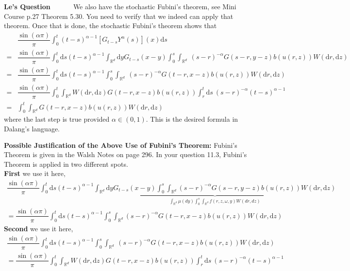 \documentclass[a4paper,11pt]{article}
\theoremstyle{plain}
\theoremstyle{definition}
\newcommand{\ud}{\ensuremath{\mathrm{d}}}
\newcommand{\R}{\mathbb{R}}
\newcounter{LQ}
\newenvironment{LeQuestion}[1][] %
  {\refstepcounter{LQ}
  \begin{mdframed}[backgroundcolor=red!10]\textbf{Le's Question \theLQ \: #1~~}~~~\noindent}%
  {\end{mdframed}}
\numberwithin{NQ}{section}
\numberwithin{LQ}{section}
\numberwithin{ZQ}{section}
\begin{document}
\begin{LeQuestion}
We also have the stochastic Fubini's theorem, see Mini Course p.27 Theorem 5.30. You need to verify that we indeed can apply that theorem. Once that is done, the stochastic Fubini's theorem shows that 
\begin{align*}
    &\dfrac{\sin(\alpha \pi)}{\pi}\int_0^t(t-s)^{\alpha-1}\left[G_{t-s}Y^\alpha(s)\right](x) \ud s \\
    =&\dfrac{\sin(\alpha \pi)}{\pi}\int_0^t \ud s (t-s)^{\alpha-1}\int_{\R^d} \ud y G_{t-s}(x-y)
    \int_0^s \int_{\R^d} \: (s-r)^{-\alpha}G(s-r,y-z)b(u(r,z))W(\ud r,\ud z)\\
    =& \dfrac{\sin(\alpha \pi)}{\pi}\int_0^t \ud s (t-s)^{\alpha-1}
    \int_0^s \int_{\R^d} \: (s-r)^{-\alpha}G(t-r,x-z)b(u(r,z))W(\ud r,\ud z)\\
    =& \dfrac{\sin(\alpha \pi)}{\pi}
    \int_0^t  \int_{\R^d} W(\ud r,\ud z)G(t-r,x-z)b(u(r,z)) 
    \int_r^t \ud s\: (s-r)^{-\alpha} (t-s)^{\alpha-1} \\
    =& \int_0^t  \int_{\R^d} G(t-r,x-z)b(u(r,z)) W(\ud r,\ud z)
\end{align*}
where the last step is true provided $\alpha\in (0,1)$. This is the desired formula in Dalang's language. 
\end{LeQuestion}
\textbf{Possible Justification of the Above Use of Fubini's Theorem:} Fubini's Theorem is given in the Walsh  Notes on page 296. In your question 11.3, Fubini's Theorem is applied in two different spots. \\ 

\noindent \textbf{First} we use it here,
\begin{align*}
     \dfrac{\sin(\alpha \pi)}{\pi}\int_0^t \ud s (t-s)^{\alpha-1}\underbrace{\int_{\R^d} \ud y G_{t-s}(x-y)
    \int_0^s \int_{\R^d}  (s-r)^{-\alpha}G(s-r,y-z)b(u(r,z))W(\ud r,\ud z)}_{\int_{\R^d}\mu(dy)\int_0^s\int_{\R^d}f(r,z,\omega,y)W(dr,dz)}
    \\ = \dfrac{\sin(\alpha \pi)}{\pi}\int_0^t \ud s (t-s)^{\alpha-1}
    \int_0^s \int_{\R^d}  (s-r)^{-\alpha}G(t-r,x-z)b(u(r,z))W(\ud r,\ud z)
\end{align*}
\textbf{Second} we use it here, 
\begin{align*}
   \dfrac{\sin(\alpha \pi)}{\pi}\int_0^t \ud s (t-s)^{\alpha-1}
    \int_0^s \int_{\R^d} \: (s-r)^{-\alpha}G(t-r,x-z)b(u(r,z))W(\ud r,\ud z)\\
    = \dfrac{\sin(\alpha \pi)}{\pi}
    \int_0^t  \int_{\R^d} W(\ud r,\ud z)G(t-r,x-z)b(u(r,z)) 
    \int_r^t \ud s\: (s-r)^{-\alpha} (t-s)^{\alpha-1} 
\end{align*}
\end{document}
